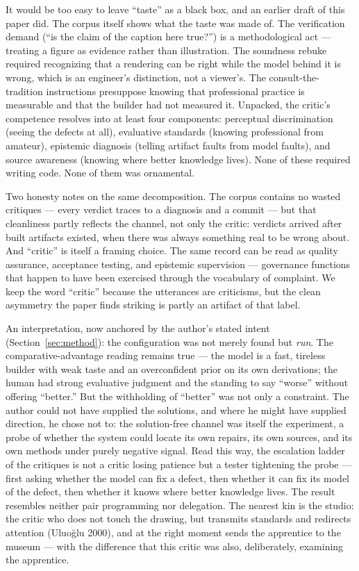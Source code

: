 \documentclass[11pt]{article}
\begin{document}
It would be too easy to leave ``taste'' as a black box, and an earlier draft of this paper did. The corpus itself shows what the taste was made of. The verification demand (``is the claim of the caption here true?'') is a methodological act — treating a figure as evidence rather than illustration. The soundness rebuke required recognizing that a rendering can be right while the model behind it is wrong, which is an engineer's distinction, not a viewer's. The consult-the-tradition instructions presuppose knowing that professional practice is measurable and that the builder had not measured it. Unpacked, the critic's competence resolves into at least four components: perceptual discrimination (seeing the defects at all), evaluative standards (knowing professional from amateur), epistemic diagnosis (telling artifact faults from model faults), and source awareness (knowing where better knowledge lives). None of these required writing code. None of them was ornamental.

Two honesty notes on the same decomposition. The corpus contains no wasted critiques — every verdict traces to a diagnosis and a commit — but that cleanliness partly reflects the channel, not only the critic: verdicts arrived after built artifacts existed, when there was always something real to be wrong about. And ``critic'' is itself a framing choice. The same record can be read as quality assurance, acceptance testing, and epistemic supervision — governance functions that happen to have been exercised through the vocabulary of complaint. We keep the word ``critic'' because the utterances are criticisms, but the clean asymmetry the paper finds striking is partly an artifact of that label.

An interpretation, now anchored by the author's stated intent (Section~\ref{sec:method}): the configuration was not merely found but \emph{run}. The comparative-advantage reading remains true — the model is a fast, tireless builder with weak taste and an overconfident prior on its own derivations; the human had strong evaluative judgment and the standing to say ``worse'' without offering ``better.'' But the withholding of ``better'' was not only a constraint. The author could not have supplied the solutions, and where he might have supplied direction, he chose not to: the solution-free channel was itself the experiment, a probe of whether the system could locate its own repairs, its own sources, and its own methods under purely negative signal. Read this way, the escalation ladder of the critiques is not a critic losing patience but a tester tightening the probe — first asking whether the model can fix a defect, then whether it can fix its model of the defect, then whether it knows where better knowledge lives. The result resembles neither pair programming nor delegation. The nearest kin is the studio: the critic who does not touch the drawing, but transmits standards and redirects attention (Uluoğlu 2000), and at the right moment sends the apprentice to the museum — with the difference that this critic was also, deliberately, examining the apprentice.
\end{document}
